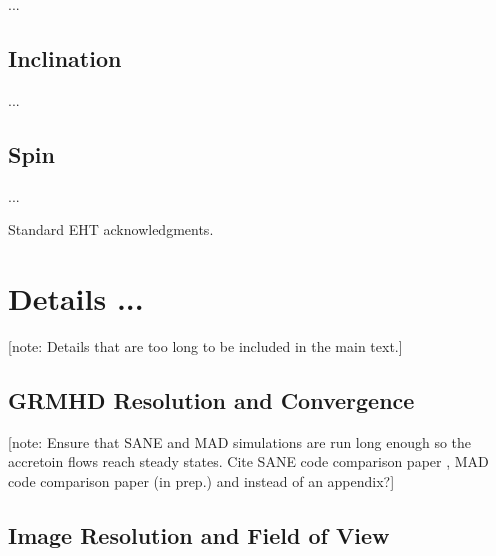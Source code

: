 \documentclass[twocolumn,tighten,dvipsnames,linenumbers]{aastex63}
\newcommand\note[1]{{\color{OliveGreen}[note: #1]}}
\begin{document}
...

\subsection{Inclination}

...

\subsection{Spin}

...

\acknowledgments

Standard EHT acknowledgments.

\vspace{5mm}



\appendix

\section{Details ...}
\label{sec:details}

\note{Details that are too long to be included in the main text.}

\subsection{GRMHD Resolution and Convergence}
\label{sec:converge}

\note{Ensure that SANE and MAD simulations are run long enough so the
  accretoin flows reach steady states.
  Cite SANE code comparison paper \citep{2019ApJS..243...26P}, MAD
  code comparison paper (in prep.) and \citet{2012MNRAS.426.3241N,
    2013MNRAS.436.3856S} instead of an appendix?}

\subsection{Image Resolution and Field of View}
\label{sec:res-FoV}
\end{document}
